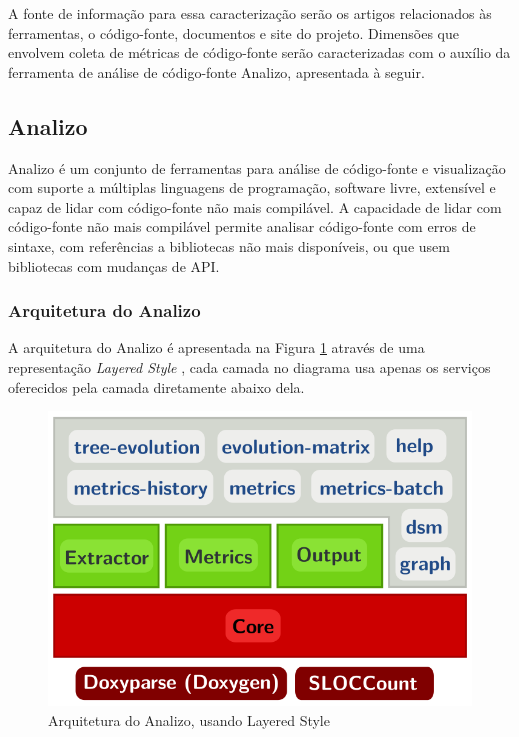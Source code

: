 A fonte de informação para essa caracterização serão os artigos relacionados às
ferramentas, o código-fonte, documentos e site do projeto. Dimensões que
envolvem coleta de métricas de código-fonte serão caracterizadas com o auxílio
da ferramenta de análise de código-fonte Analizo, apresentada à seguir.

\subsection{Analizo} \label{analizo}

Analizo é um conjunto de ferramentas para análise de código-fonte e
visualização com suporte a múltiplas linguagens de programação, software livre,
extensível e capaz de lidar com código-fonte não mais compilável. A capacidade
de lidar com código-fonte não mais compilável permite analisar código-fonte
com erros de sintaxe, com referências a bibliotecas não mais disponíveis, ou
que usem bibliotecas com mudanças de API.


\subsubsection{Arquitetura do Analizo}

A arquitetura do Analizo é apresentada na Figura \ref{arquitetura-analizo}
através de uma representação {\it Layered Style} \cite{Clements2002}, cada
camada no diagrama usa apenas os serviços oferecidos pela camada diretamente
abaixo dela.

\begin{figure}[h]
\center
\includegraphics[scale=0.3]{imagens/analizo-architecture.png}
\caption{Arquitetura do Analizo, usando Layered Style \cite{Clements2002}}
\label{arquitetura-analizo}
\end{figure}

